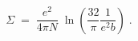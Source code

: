 \begin{equation}\label{eq:defsigma}
\Sigma \;=\; \frac{e^2}{4 \pi N} \;
\ln\left( \frac{32}{\pi} \frac{1}{e^2 b} \right)\;.
\end{equation}

